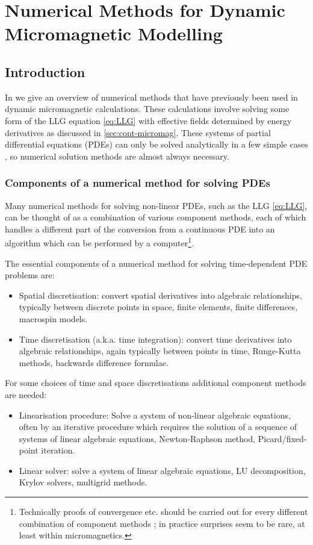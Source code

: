 \chapter{Numerical Methods for Dynamic Micromagnetic Modelling}
\label{sec:numer-meth-micr}

\section{Introduction}

In  we give an overview of numerical methods that have previously been used in dynamic micromagnetic calculations.
These calculations involve solving some form of the LLG equation \cref{eq:LLG} with effective fields determined by energy derivatives as discussed in \cref{sec:cont-micromag}.
These systems of partial differential equations (PDEs) can only be solved analytically in a few simple cases \cite{Aharoni1996}, so numerical solution methods are almost always necessary.


\subsection{Components of a numerical method for solving PDEs}

Many numerical methods for solving non-linear PDEs, such as the LLG \cref{eq:LLG}, can be thought of as a combination of various component methods, each of which handles a different part of the conversion from a continuous PDE into an algorithm which can be performed by a computer\footnote{Technically proofs of convergence etc. should be carried out for every different combination of component methods \cite[382]{Iserles2009}; in practice surprises seem to be rare, at least within micromagnetics.}.

The essential components of a numerical method for solving time-dependent PDE problems are:
\begin{itemize}
\item Spatial discretisation: convert spatial derivatives into algebraic relationships, typically between discrete points in space, \eg finite elements, finite differences, macrospin models.
\item Time discretisation (a.k.a. time integration): convert time derivatives into algebraic relationships, again typically between points in time, \eg Runge-Kutta methods, backwards difference formulae.
\end{itemize}
For some choices of time and space discretisations additional component methods are needed:
\begin{itemize}
\item Linearisation procedure: Solve a system of non-linear algebraic equations, often by an iterative procedure which requires the solution of a sequence of systems of linear algebraic equations, \eg Newton-Raphson method, Picard/fixed-point iteration.
\item Linear solver: solve a system of linear algebraic equations, \eg LU decomposition, Krylov solvers, multigrid methods.
\end{itemize}

